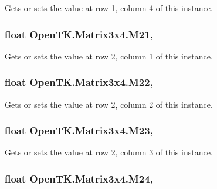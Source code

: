 Gets or sets the value at row 1, column 4 of this instance. 

\hypertarget{struct_open_t_k_1_1_matrix3x4_a2a6b4e1fe73a29d0de429d389322391b}{
\subsubsection[{M21}]{\setlength{\rightskip}{0pt plus 5cm}float Open\-T\-K.\-Matrix3x4.\-M21\hspace{0.3cm}{\ttfamily [get]}, {\ttfamily [set]}}}\label{struct_open_t_k_1_1_matrix3x4_a2a6b4e1fe73a29d0de429d389322391b}


Gets or sets the value at row 2, column 1 of this instance. 

\hypertarget{struct_open_t_k_1_1_matrix3x4_aedf2aae9f2d2a4e87c734fa78b69a6a7}{
\subsubsection[{M22}]{\setlength{\rightskip}{0pt plus 5cm}float Open\-T\-K.\-Matrix3x4.\-M22\hspace{0.3cm}{\ttfamily [get]}, {\ttfamily [set]}}}\label{struct_open_t_k_1_1_matrix3x4_aedf2aae9f2d2a4e87c734fa78b69a6a7}


Gets or sets the value at row 2, column 2 of this instance. 

\hypertarget{struct_open_t_k_1_1_matrix3x4_a02b0048a8c53fc9e502587337c8b4ab7}{
\subsubsection[{M23}]{\setlength{\rightskip}{0pt plus 5cm}float Open\-T\-K.\-Matrix3x4.\-M23\hspace{0.3cm}{\ttfamily [get]}, {\ttfamily [set]}}}\label{struct_open_t_k_1_1_matrix3x4_a02b0048a8c53fc9e502587337c8b4ab7}


Gets or sets the value at row 2, column 3 of this instance. 

\hypertarget{struct_open_t_k_1_1_matrix3x4_ab10ec533c03c0636792e9d4925e856ec}{
\subsubsection[{M24}]{\setlength{\rightskip}{0pt plus 5cm}float Open\-T\-K.\-Matrix3x4.\-M24\hspace{0.3cm}{\ttfamily [get]}, {\ttfamily [set]}}}\label{struct_open_t_k_1_1_matrix3x4_ab10ec533c03c0636792e9d4925e856ec}


